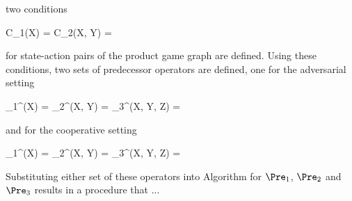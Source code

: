     two conditions

    \startformula
        \startalign[n=2,align={right,left}]
            \NC C_1(X) =
            \NC {} \EndAnd
            \NR
            \NC C_2(X, Y) =
            \NC {}
            \NR
        \stopalign
    \stopformula

    for state-action pairs of the product game graph are defined.  
    Using these conditions, two sets of predecessor operators are defined, one for the adversarial setting

    \startformula
        \startalign[n=2,align={right,left}]
            \NC \Pre_1^{\Adversarial}(X) =
            \NC {}
            \NR
            \NC \empty
            \NC \quad \cup {} \EndComma
            \NR
            \NC \Pre_2^{\Adversarial}(X, Y) =
            \NC {}
            \NR
            \NC \empty
            \NC \quad \cup {} \EndComma
            \NR
            \NC \Pre_3^{\Adversarial}(X, Y, Z) =
            \NC {}
            \NR
            \NC \empty
            \NC \quad \cup {}
            \NR
        \stopalign
    \stopformula

    and for the cooperative setting

    \startformula
        \startalign[n=2,align={right,left}]
            \NC \Pre_1^{\Cooperative}(X) =
            \NC {} \EndComma
            \NR
            \NC \Pre_2^{\Cooperative}(X, Y) =
            \NC {} \EndComma
            \NR
            \NC \Pre_3^{\Cooperative}(X, Y, Z) =
            \NC {} \EndPeriod
            \NR
        \stopalign
    \stopformula

    Substituting either set of these operators into Algorithm  for $\Pre_1$, $\Pre_2$ and $\Pre_3$ results in a procedure that ... %

